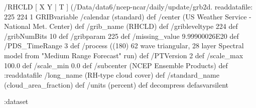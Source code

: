 \begin{ingrid}
  /RHCLD { [ X Y | T ] (/Data/data6/ncep-ncar/daily/update/grb2d.%
  readdatafile:
  225 224 1 GRIBvariable
  /calendar (standard) def
  /center (US Weather Service - National Met. Center) def
  /grib_name (RHCLD) def
  /gribleveltype 224 def
  /gribNumBits 10 def
  /gribparam 225 def
  /missing_value 9.99900026E20 def
  /PDS_TimeRange 3 def
  /process ((180) 62 wave triangular, 28 layer Spectral model from "Medium Range Forecast" run) def
  /PTVersion 2 def
  /scale_max 100.0 def
  /scale_min 0.0 def
  /subcenter (NCEP Ensemble Products) def
  :readdatafile
  /long_name (RH-type cloud cover) def
  /standard_name (cloud_area_fraction) def
  /units (percent) def
  decompress
  } defasvarsilent

 :dataset

\end{ingrid}

